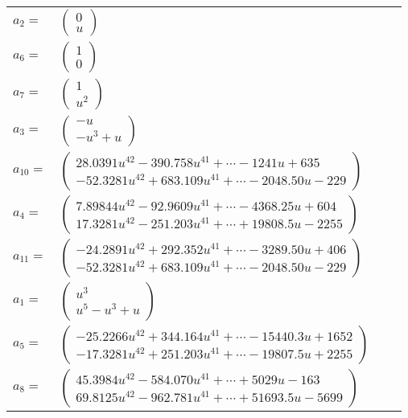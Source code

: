 \documentclass[1p]{elsarticle_modified}
\theoremstyle{definition}
\begin{document}
\begin{tabular}{m{7pt} m{180pt} m{7pt} m{180pt} }
\flushright $a_{2}=$&$\begin{pmatrix}0\\u\end{pmatrix}$ \\
\flushright $a_{6}=$&$\begin{pmatrix}1\\0\end{pmatrix}$ \\
\flushright $a_{7}=$&$\begin{pmatrix}1\\u^2\end{pmatrix}$ \\
\flushright $a_{3}=$&$\begin{pmatrix}- u\\- u^3+u\end{pmatrix}$ \\
\flushright $a_{10}=$&$\begin{pmatrix}28.0391 u^{42}-390.758 u^{41}+\cdots-1241 u+635\\-52.3281 u^{42}+683.109 u^{41}+\cdots-2048.50 u-229\end{pmatrix}$ \\
\flushright $a_{4}=$&$\begin{pmatrix}7.89844 u^{42}-92.9609 u^{41}+\cdots-4368.25 u+604\\17.3281 u^{42}-251.203 u^{41}+\cdots+19808.5 u-2255\end{pmatrix}$ \\
\flushright $a_{11}=$&$\begin{pmatrix}-24.2891 u^{42}+292.352 u^{41}+\cdots-3289.50 u+406\\-52.3281 u^{42}+683.109 u^{41}+\cdots-2048.50 u-229\end{pmatrix}$ \\
\flushright $a_{1}=$&$\begin{pmatrix}u^3\\u^5- u^3+u\end{pmatrix}$ \\
\flushright $a_{5}=$&$\begin{pmatrix}-25.2266 u^{42}+344.164 u^{41}+\cdots-15440.3 u+1652\\-17.3281 u^{42}+251.203 u^{41}+\cdots-19807.5 u+2255\end{pmatrix}$ \\
\flushright $a_{8}=$&$\begin{pmatrix}45.3984 u^{42}-584.070 u^{41}+\cdots+5029 u-163\\69.8125 u^{42}-962.781 u^{41}+\cdots+51693.5 u-5699\end{pmatrix}$ \\

\end{tabular}
\end{document}
